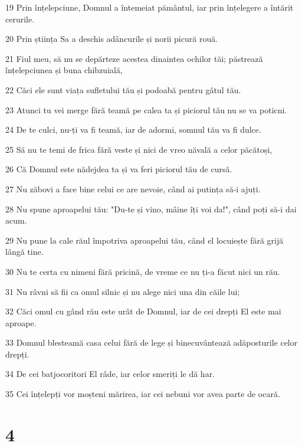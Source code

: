 \par 19 Prin înțelepciune, Domnul a întemeiat pământul, iar prin înțelegere a întărit cerurile.
\par 20 Prin știința Sa a deschis adâncurile și norii picură rouă.
\par 21 Fiul meu, să nu se depărteze acestea dinaintea ochilor tăi; păstrează înțelepciunea și buna chibzuială,
\par 22 Căci ele sunt viața sufletului tău și podoabă pentru gâtul tău.
\par 23 Atunci tu vei merge fără teamă pe calea ta și piciorul tău nu se va poticni.
\par 24 De te culci, nu-ți va fi teamă, iar de adormi, somnul tău va fi dulce.
\par 25 Să nu te temi de frica fără veste și nici de vreo năvală a celor păcătoși,
\par 26 Că Domnul este nădejdea ta și va feri piciorul tău de cursă.
\par 27 Nu zăbovi a face bine celui ce are nevoie, când ai putința să-i ajuți.
\par 28 Nu spune aproapelui tău: "Du-te și vino, mâine îți voi da!", când poți să-i dai acum.
\par 29 Nu pune la cale răul împotriva aproapelui tău, când el locuiește fără grijă lângă tine.
\par 30 Nu te certa cu nimeni fără pricină, de vreme ce nu ți-a făcut nici un rău.
\par 31 Nu râvni să fii ca omul silnic și nu alege nici una din căile lui;
\par 32 Căci omul cu gând rău este urât de Domnul, iar de cei drepți El este mai aproape.
\par 33 Domnul blesteamă casa celui fără de lege și binecuvântează adăposturile celor drepți.
\par 34 De cei batjocoritori El râde, iar celor smeriți le dă har.
\par 35 Cei înțelepți vor moșteni mărirea, iar cei nebuni vor avea parte de ocară.

\chapter{4}

